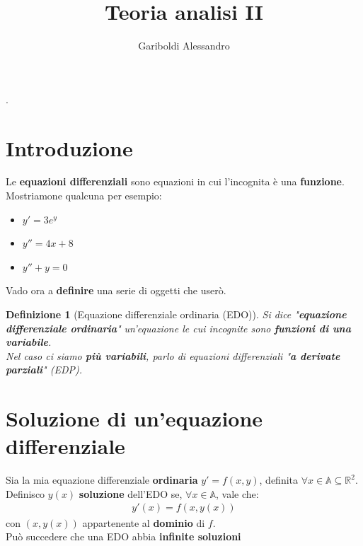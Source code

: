 \documentclass[a4paper, oneside]{article}
\title{Teoria analisi II}
\author{Gariboldi Alessandro}
\date{ }
\newcommand\R{\mathbb{R}}
\newcommand\A{\mathbb{A}}
\begin{document}
                {}          %
                {}          %
                {\slshape}  %
                {}          %
                {\bfseries} %
                {.}         %
                {\newline}         %
                {}          %
\theoremstyle{theoremEnv}

\newtheorem{definition}{Definizione}[section]
\newtheorem{theorem}{Teorema}[section]
\newtheorem{lemma}{Lemma}[section]
\newtheorem{observation}{Oss.}[section]
\newtheorem{corollary}{Corollario}[theorem]
\newtheorem{example}{Esempio}[section]
\newtheorem{problem}{Problema}[section]
\newtheorem{solution}{Soluzione}[section]
\newtheorem{proposition}{Proposizione}[section]
\newtheorem{inciso}{Inciso}[section]

\maketitle

\tableofcontents

\newpage

\section{Introduzione}
    Le \textbf{equazioni differenziali} sono equazioni in cui l'incognita è una \textbf{funzione}. Mostriamone qualcuna per esempio:
    \begin{itemize}
        \item $y'=3 e^y$
        \item $y''=4x+8$
        \item $y''+y=0$
    \end{itemize}
    Vado ora a \textbf{definire} una serie di oggetti che userò.

    \begin{definition}[Equazione differenziale ordinaria (EDO)]
        Si dice "\textbf{equazione differenziale ordinaria}" un'equazione le cui incognite sono \textbf{funzioni di una variabile}. \\
        Nel caso ci siamo \textbf{più variabili}, parlo di equazioni differenziali "\textbf{a derivate parziali}" (EDP). 
    \end{definition}

    \section{Soluzione di un'equazione differenziale}
    Sia la mia equazione differenziale \textbf{ordinaria} $y'=f(x,y)$, definita $\forall x\in \A \subseteq \R^2$.\\
    Definisco $y(x)$ \textbf{soluzione} dell'EDO se, $\forall x\in \A$, vale che:
    \begin{gather*}
        y'(x) = f\left(x,y(x)\right)
    \end{gather*}
    con $\left(x,y(x)\right)$ appartenente al \textbf{dominio} di $f$.\\
    Può succedere che una EDO abbia \textbf{infinite soluzioni}
\end{document}
